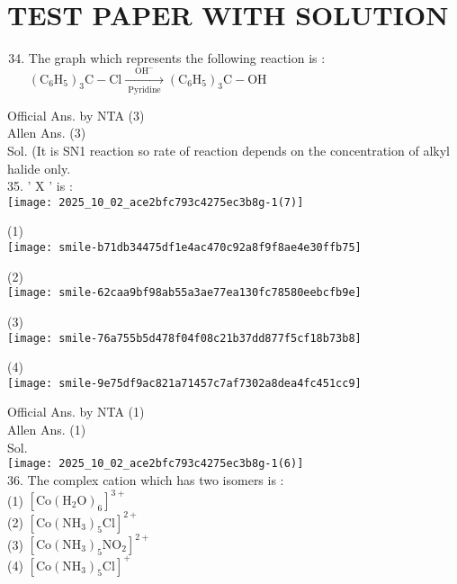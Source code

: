 \documentclass[10pt]{article}
\begin{document}
\section*{TEST PAPER WITH SOLUTION}
\begin{enumerate}
  \setcounter{enumi}{33}
  \item The graph which represents the following reaction is :\\
\(\left(\mathrm{C}_{6} \mathrm{H}_{5}\right)_{3} \mathrm{C}-\mathrm{Cl} \xrightarrow[\text { Pyridine }]{\mathrm{OH}^{-}}\left(\mathrm{C}_{6} \mathrm{H}_{5}\right)_{3} \mathrm{C}-\mathrm{OH}\)
\end{enumerate}

Official Ans. by NTA (3)\\
Allen Ans. (3)\\
Sol. (It is SN1 reaction so rate of reaction depends on the concentration of alkyl halide only.\\
35. ' X ' is :\\
\texttt{[image: 2025\_10\_02\_ace2bfc793c4275ec3b8g-1(7)]}

(1)\\
\texttt{[image: smile-b71db34475df1e4ac470c92a8f9f8ae4e30ffb75]}

(2)\\
\texttt{[image: smile-62caa9bf98ab55a3ae77ea130fc78580eebcfb9e]}

(3)\\
\texttt{[image: smile-76a755b5d478f04f08c21b37dd877f5cf18b73b8]}

(4)\\
\texttt{[image: smile-9e75df9ac821a71457c7af7302a8dea4fc451cc9]}

Official Ans. by NTA (1)\\
Allen Ans. (1)\\
Sol.\\
\texttt{[image: 2025\_10\_02\_ace2bfc793c4275ec3b8g-1(6)]}\\
36. The complex cation which has two isomers is :\\
(1) \(\left[\mathrm{Co}\left(\mathrm{H}_{2} \mathrm{O}\right)_{6}\right]^{3+}\)\\
(2) \(\left[\mathrm{Co}\left(\mathrm{NH}_{3}\right)_{5} \mathrm{Cl}\right]^{2+}\)\\
(3) \(\left[\mathrm{Co}\left(\mathrm{NH}_{3}\right)_{5} \mathrm{NO}_{2}\right]^{2+}\)\\
(4) \(\left[\mathrm{Co}\left(\mathrm{NH}_{3}\right)_{5} \mathrm{Cl}\right]^{+}\)
\end{document}

